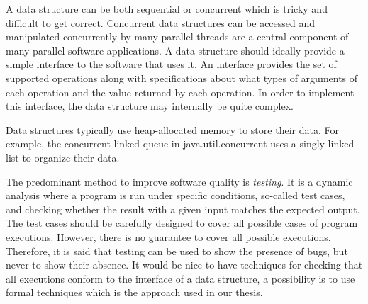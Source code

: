A data structure can be both sequential or concurrent  which is tricky and difficult to get correct. Concurrent data structures can be accessed and manipulated concurrently by many parallel threads are a central component of many parallel software applications. A data structure should ideally provide a simple interface to the software that uses it. An interface provides the set of supported operations along with specifications about what types of arguments of each operation and the value returned by each operation.  In order to implement this interface, the data structure may internally be quite complex.

Data structures typically use heap-allocated memory to store their data. For example, the concurrent linked queue in java.util.concurrent uses a singly linked list to organize their data. 

The predominant method to improve  software quality is
\emph{testing}. It is a dynamic analysis where a program is run  under specific conditions, so-called  test cases, and  checking whether the result with  a given input matches the expected output.
%
The test cases should be carefully designed to cover all possible cases of program executions.
However, there is no guarantee  to cover all possible executions. Therefore, it is said that
testing can be used to show the presence of bugs, but never to show their absence.  
It would be nice to have techniques for checking that all executions conform to the interface of a data structure,
a possibility is to use formal techniques which is the approach used in our  thesis.

